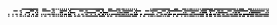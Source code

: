 \documentclass[10pt]{article}
\theoremstyle{plain}
\theoremstyle{definition}
\begin{document}
\begin{table*}[b]
{\begin{minipage}{5.32in}
\[\begin{array}{@{}r@{}}
\begin{array}{@{}l@{}}
\a\a\a\a\a\a\a\a\a\a\a\a\a\a\a\a\b\b\b\b\b\b\b\b\b\b\b\b\b\b\b\b\a\a\a\a \b\b\b\b\a\a\a\a\a\b\b\b\a\b\a\b\a\b\a\b\a\b\a\b\a\b\a\b\b\b\b\b\b\b\b\b \b\b\b\b\b\b\b\b\b\b\b\b\b\b\b\b\b\b\b\b\b\b\b\b\a\a\a\a\b\b\b\b\a\a\a\a \b\b\b\b\a\b\b\b\a\b\a\b\a\b\a\b\a\b\a\b\a\a\a\a\a\a\a\a\a\a\a\a\a\b\a\b \b\b\b\b\b\b\b\b\b\b\b\b\b\b\b\b\a\a\a\a\b\b\b\b\a\a\a\a\b\b\b\b\a\b\a\b \b\b\a\b\a\b\a\b\a\b\a\b\b\b\b\b\b\b\b\b\b\b\a\b\b\b\b\b\b\b\b\b\b\b\b\b \b\b\b\b\b\b\b\b\a\b\a\b\b\b\b\b\a\a\a\a\b\b\b\b\a\b\a\b\a\b\a\b\a\b\a\b \a\b\a\b\mynl
\a\a\a\a\a\a\a\a\b\b\b\b\a\a\b\b\a\a\a\a\a\a\a\a\b\b\b\b\a\a\b\b\a\a\a\a \b\b\b\b\b\b\b\b\a\a\b\b\a\a\a\a\a\b\b\b\b\b\b\b\a\a\b\b\a\a\a\a\a\a\a\a \b\b\b\b\a\a\b\b\a\a\a\a\a\a\a\a\b\b\b\b\a\a\b\b\a\a\a\a\b\b\b\b\b\b\b\b \b\a\b\b\a\a\b\b\b\b\b\b\b\b\b\b\a\a\b\b\b\b\b\b\a\a\a\a\b\b\b\b\a\b\b\b \b\b\b\b\a\a\a\a\b\b\b\b\a\a\b\b\b\b\b\b\b\b\b\b\b\b\b\b\a\a\b\b\b\b\b\b \b\b\b\b\b\b\b\b\a\a\b\b\b\b\b\b\a\a\b\b\b\b\b\b\a\a\b\b\b\a\b\b\a\a\a\a \b\b\b\b\a\a\b\b\b\b\b\b\b\b\b\b\b\b\b\b\a\a\b\b\b\b\b\b\b\b\b\b\b\b\b\b \a\a\b\b\mynl
\a\a\a\a\a\a\a\a\a\a\a\a\a\a\a\b\a\a\a\a\b\b\b\b\a\a\a\a\a\b\a\b\a\a\a\a \a\a\a\a\a\a\a\a\a\b\a\b\a\a\a\a\a\b\b\b\a\a\a\a\a\b\a\b\b\b\b\b\a\a\a\a \a\a\a\a\a\b\a\b\b\b\b\b\b\b\b\b\a\a\a\a\b\b\a\b\b\b\b\b\a\a\a\a\a\a\a\a \a\b\a\b\b\b\a\b\b\b\b\b\a\a\a\a\a\b\a\b\a\a\a\a\a\a\a\a\a\a\a\a\a\a\a\b \a\a\a\a\b\b\b\b\a\a\a\a\a\b\a\b\a\a\a\a\a\a\a\a\a\a\a\a\a\b\a\b\a\a\a\a \a\b\b\b\a\a\a\a\a\b\a\b\b\b\b\b\a\a\a\b\a\a\a\a\a\b\a\b\b\b\b\b\b\b\b\b \a\a\a\a\a\b\a\b\b\a\b\b\a\a\a\a\a\a\a\a\a\b\a\b\b\b\b\b\b\b\b\b\a\a\a\a \a\b\a\b\mynl
\a\a\a\b\a\a\a\b\a\a\b\b\a\a\b\b\a\a\a\b\a\a\a\b\a\a\b\b\a\a\b\b\a\a\a\b \a\b\a\b\a\b\b\b\a\b\b\b\a\b\a\b\a\b\a\b\a\b\b\b\a\b\b\b\a\a\a\b\a\a\a\b \a\a\b\b\a\a\b\b\a\a\a\b\a\a\a\b\a\a\b\b\a\a\b\b\a\b\a\b\a\b\a\b\b\b\b\b \b\b\b\b\a\b\b\b\a\b\a\b\a\b\b\b\a\b\b\b\b\a\a\b\b\a\a\b\b\b\b\b\b\b\b\b \b\a\a\b\a\a\a\b\b\a\b\b\b\a\b\b\b\b\a\b\b\b\a\b\b\b\b\b\b\b\b\b\b\b\a\b \b\b\a\b\b\b\b\b\b\b\b\b\b\a\a\b\b\a\b\b\b\a\b\b\b\a\b\b\b\a\a\b\b\a\a\b \b\a\b\b\b\a\b\b\b\b\a\b\b\b\a\b\b\b\b\b\b\b\b\b\b\b\a\b\b\b\a\b\b\b\b\b \b\b\b\b\mynl
\a\a\a\b\a\a\a\b\a\a\a\b\a\a\b\b\a\b\a\b\a\b\b\b\a\b\a\b\a\b\b\b\a\a\a\b \a\a\b\b\a\a\a\b\a\a\b\b\a\b\a\b\a\b\b\b\a\b\a\b\a\b\b\b\b\a\a\b\b\a\b\b \b\a\a\b\b\a\b\b\b\b\b\b\b\b\b\b\b\b\a\b\b\b\b\b\b\a\a\b\b\a\b\b\a\a\a\b \b\a\b\b\b\b\b\b\b\b\b\b\b\b\a\b\b\b\b\b\a\a\a\b\a\a\b\b\a\a\a\b\a\b\b\b \a\b\a\b\b\b\b\b\a\b\a\b\a\b\b\b\a\a\a\b\a\a\b\b\a\a\a\b\a\a\b\b\a\b\a\b \b\b\b\b\a\b\a\b\a\b\b\b\b\a\a\b\b\a\b\b\b\a\a\b\b\a\b\b\b\b\a\b\b\b\b\b \b\b\a\b\b\b\b\b\b\b\a\b\b\a\b\b\b\a\a\b\b\a\b\b\b\b\a\b\b\b\b\b\b\b\a\b \b\b\b\b

\end{array}
\end{array}\]
\end{minipage}}
\end{table*}
\end{document}

